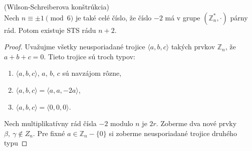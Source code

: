 \begin{theorem}{(Wilson-Schreiberova konštrúkcia)}\\
	Nech $n \equiv \pm 1 \pmod6$ je také celé číslo, že číslo $-2$ má v grupe $(\mathbb{Z}^*_n, \cdot)$ párny rád. Potom existuje STS rádu $n + 2$.
\end{theorem}
\begin{proof}
	Uvažujme všetky neusporiadané trojice $\langle a, b, c \rangle$ takých prvkov $\mathbb{Z}_n$, že $a + b + c = 0$. Tieto trojice sú troch typov:
	\begin{enumerate}
		\item $\langle a, b, c \rangle$, $a$, $b$, $c$ sú navzájom rôzne,
		\item $\langle a, b, c \rangle = \langle a, a, -2a \rangle$,
		\item $\langle a, b, c \rangle = \langle 0, 0, 0 \rangle$.
	\end{enumerate}
	Nech multiplikatívny rád čísla $-2$ modulo $n$ je $2r$. Zoberme dva nové prvky $\beta,\ \gamma \notin Z_n$. Pre fixné $a \in \mathbb{Z}_n - \{0\}$ si zoberme neusporiadané trojice druhého typu
	

\end{proof}
